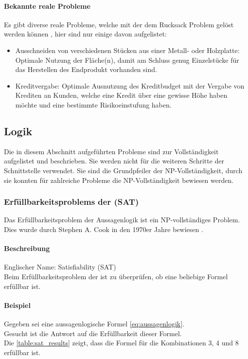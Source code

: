 	\paragraph{Bekannte reale Probleme}	
	Es gibt diverse reale Probleme, welche mit der dem Rucksack Problem gelöst werden können \cite{kellerer2004knapsack}, hier sind nur einige davon aufgelistet:
	\begin{itemize}
		\item Ausschneiden von verschiedenen Stücken aus einer Metall- oder Holzplatte: Optimale Nutzung der Fläche(n), damit am Schluss genug Einzelstücke für das Herstellen 
			des Endprodukt vorhanden sind.
		\item Kreditvergabe: Optimale Ausnutzung des Kreditbudget mit der Vergabe von Krediten an Kunden, welche eine Kredit über eine gewisse Höhe haben möchte und eine 
			bestimmte Risikoeinstufung haben.
	\end{itemize}


\newpage
\subsection{Logik}\label{logic}
Die in diesem Abschnitt aufgeführten Probleme sind zur Vollständigkeit aufgelistet und beschrieben. Sie werden nicht für die weiteren Schritte der Schnittstelle verwendet. Sie sind die 
Grundpfeiler der NP-Vollständigkeit, durch sie konnten für zahlreiche Probleme die NP-Vollständigkeit bewiesen werden.

	\subsubsection{Erfüllbarkeitsproblems der  (SAT)}\label{sat}
	Das Erfüllbarkeitsproblem der Aussagenlogik ist ein NP-vollständiges Problem. Dies wurde durch Stephen A. Cook in den 1970er Jahre bewiesen \cite{cook_complexity}.

	\paragraph{Beschreibung}
	Englischer Name: Satisfiability (SAT)\\
	Beim Erfüllbarkeitsproblem der  ist zu überprüfen, ob eine beliebige  Formel erfüllbar ist.	

	\paragraph{Beispiel} Gegeben sei eine aussagenlogische Formel \ref{eq:aussagenlogik}.\\
	Gesucht ist die Antwort auf die Erfüllbarkeit dieser Formel.\\
	Die \autoref{table:sat_results} zeigt, dass die Formel für die Kombinationen 3, 4 und 8 erfüllbar ist.

